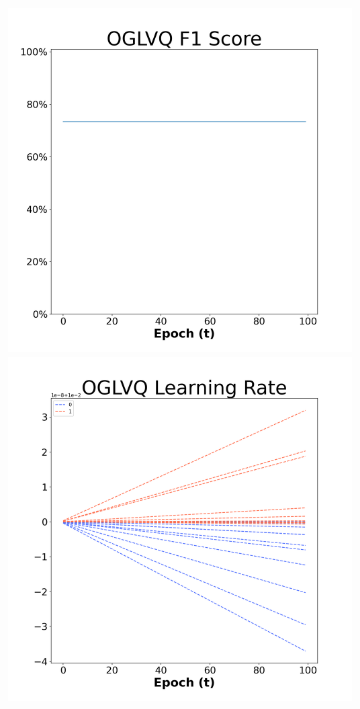 \begin{figure}[H]
  \centering %
\begin{subfigure}{0.3\textwidth}
\includegraphics[width=\linewidth]{images/exper2/SP/OGLVQ_0.01_f1.png}
  \includegraphics[width=\linewidth]{images/exper2/SP/OGLVQ_0.01_lr.png}

\end{subfigure}
\end{figure}
